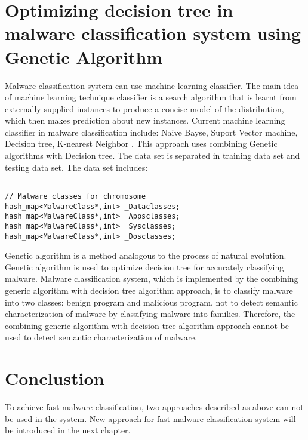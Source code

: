 \section{Optimizing decision tree in malware classification system using Genetic Algorithm}
Malware classification system can use machine learning classifier. The main idea of machine learning technique classifier is a search algorithm that is learnt from externally supplied instances to produce a concise model of the distribution, which then  makes prediction about new  instances. Current machine learning classifier in malware classification include: Naive Bayse, Suport Vector machine, Decision tree, K-nearest Neighbor \cite{mohd}. This approach uses combining Genetic algorithms with Decision tree. The data set is separated in training data set and testing data set. The data set includes:
\begin{verbatim}

// Malware classes for chromosome
hash_map<MalwareClass*,int> _Dataclasses;
hash_map<MalwareClass*,int> _Appsclasses;
hash_map<MalwareClass*,int> _Sysclasses;
hash_map<MalwareClass*,int> _Dosclasses;

\end{verbatim}
Genetic algorithm is a method analogous to the process of natural evolution. Genetic algorithm is used to optimize decision tree for accurately classifying malware. Malware classification system, which is implemented by the combining generic algorithm with decision tree algorithm approach, is to classify malware into two classes: benign program and malicious program, not to detect semantic characterization of malware by classifying malware into families. Therefore, the combining generic algorithm with decision tree algorithm approach cannot be used to detect semantic characterization of malware.
\section{Conclustion}
To achieve fast malware classification, two approaches described as above can not be used in the system. New approach for fast malware classification system will be introduced in the next chapter. 